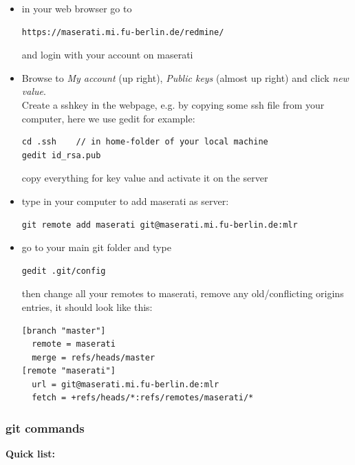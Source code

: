 \begin{itemize}
\item in your web browser go to
\begin{verbatim}
https://maserati.mi.fu-berlin.de/redmine/
\end{verbatim}
and login with your account on maserati

\item  Browse to \textit{My account} (up right), \textit{Public
keys} (almost up right) and click \textit{new value}.  \\
Create a sshkey in the webpage, e.g. by copying some ssh file from your
computer, here we use gedit for example:
\begin{verbatim}
cd .ssh    // in home-folder of your local machine
gedit id_rsa.pub
\end{verbatim}
copy everything for key value and activate it on the server
\item type in your computer to add maserati as server:
\begin{verbatim}
git remote add maserati git@maserati.mi.fu-berlin.de:mlr
\end{verbatim}
\item
go to your main git folder and type
\begin{verbatim}
gedit .git/config
\end{verbatim}
then change all your remotes to maserati, remove any old/conflicting
origins entries, it should look like this:
\begin{verbatim}
[branch "master"]
  remote = maserati
  merge = refs/heads/master
[remote "maserati"]
  url = git@maserati.mi.fu-berlin.de:mlr
  fetch = +refs/heads/*:refs/remotes/maserati/*
\end{verbatim}
\end{itemize}





\subsubsection{git commands}


\textbf{Quick list:}

